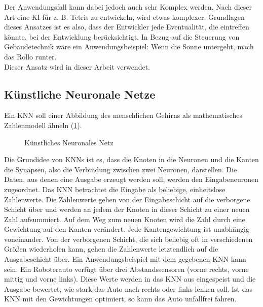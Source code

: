 Der Anwendungsfall kann dabei jedoch auch sehr Komplex werden. Nach dieser Art eine \gls{KI} für z. B. Tetris zu entwickeln, wird etwas komplexer. Grundlagen dieses Ansatzes ist es also, dass der Entwickler jede Eventualität, die eintreffen könnte, bei der Entwicklung berücksichtigt. In Bezug auf die Steuerung von Gebäudetechnik wäre ein Anwendungsbeispiel: Wenn die Sonne untergeht, mach das Rollo runter.\\
Dieser Ansatz wird in dieser Arbeit verwendet.

\subsection{Künstliche Neuronale Netze}
Ein \gls{KNN} soll einer Abbildung des menschlichen Gehirns als mathematisches Zahlenmodell ähneln (\cref{fig-knn}).

\begin{figure}[htbp]
    \centering
    \caption{\label{fig-knn}Künstliches Neuronales Netz}
\end{figure}

Die Grundidee von \glspl{KNN} ist es, dass die Knoten in  die Neuronen und die Kanten die Synapsen, also die Verbindung zwischen zwei Neuronen, darstellen. Die Daten, aus denen eine Ausgabe erzeugt werden soll, werden den Eingabeneuronen zugeordnet. Das \gls{KNN} betrachtet die Eingabe als beliebige, einheitslose Zahlenwerte. Die Zahlenwerte gehen von der Eingabeschicht auf die verborgene Schicht über und werden an jedem der Knoten in dieser Schicht zu einer neuen Zahl aufsummiert. Auf dem Weg zum neuen Knoten wird die Zahl durch eine Gewichtung auf den Kanten verändert. Jede Kantengewichtung ist unabhängig voneinander. Von der verborgenen Schicht, die sich beliebig oft in verschiedenen Größen wiederholen kann, gehen die Zahlenwerte letztendlich auf die Ausgabeschicht über. Ein Anwendungsbeispiel mit dem gegebenen \gls{KNN} kann sein: Ein Roboterauto verfügt über drei Abstandssensoren (vorne rechts, vorne mittig und vorne links). Diese Werte werden in das \gls{KNN} aus  eingespeist und die Ausgabe bewertet, wie stark das Auto nach rechts oder links lenken soll. Ist das \gls{KNN} mit den Gewichtungen optimiert, so kann das Auto unfallfrei fahren.\\